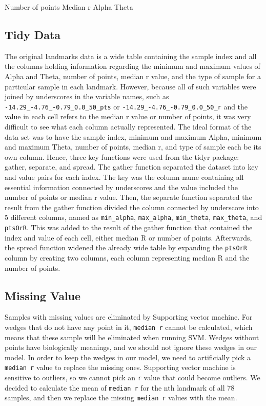 \documentclass[10pt,letterpaper]{article}
\begin{document}
Number of points Median r Alpha Theta

\subsection{Tidy Data}\label{tidy-data}

The original landmarks data is a wide table containing the sample index
and all the columns holding information regarding the minimum and
maximum values of Alpha and Theta, number of points, median r value, and
the type of sample for a particular sample in each landmark. However,
because all of such variables were joined by underscores in the variable
names, such as \texttt{-14.29\_-4.76\_-0.79\_0.0\_50\_pts} or
\texttt{-14.29\_-4.76\_-0.79\_0.0\_50\_r} and the value in each cell
refers to the median r value or number of points, it was very difficult
to see what each column actually represented. The ideal format of the
data set was to have the sample index, minimum and maximum Alpha,
minimum and maximum Theta, number of points, median r, and type of
sample each be its own column. Hence, three key functions were used from
the tidyr package: gather, separate, and spread. The gather function
separated the dataset into key and value pairs for each index. The key
was the column name containing all essential information connected by
underscores and the value included the number of points or median r
value. Then, the separate function separated the result from the gather
function divided the column connected by underscore into 5 different
columns, named as \texttt{min\_alpha}, \texttt{max\_alpha},
\texttt{min\_theta}, \texttt{max\_theta}, and \texttt{ptsOrR}. This was
added to the result of the gather function that contained the index and
value of each cell, either median R or number of points. Afterwards, the
spread function widened the already wide table by expanding the
\texttt{ptsOrR} column by creating two columns, each column representing
median R and the number of points.

\subsection{Missing Value}\label{missing-value}

Samples with missing values are eliminated by Supporting vector machine.
For wedges that do not have any point in it, \texttt{median\ r} cannot
be calculated, which means that these sample will be eliminated when
running SVM. Wedges without points have biologically meanings, and we
should not ignore these wedges in our model. In order to keep the wedges
in our model, we need to artificially pick a \texttt{median\ r} value to
replace the missing ones. Supporting vector machine is sensitive to
outliers, so we cannot pick an \texttt{r} value that could become
outliers. We decided to calculate the mean of \texttt{median\ r} for the
nth landmark of all 78 samples, and then we replace the missing
\texttt{median\ r} values with the mean.
\end{document}
